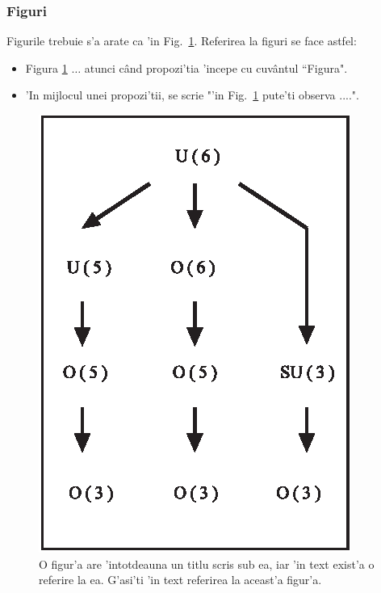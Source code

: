 \subsubsection{Figuri}

Figurile trebuie s'a arate ca 'in Fig.~\ref{fig:figura_exemplu}. Referirea la figuri se face astfel:
\begin{itemize}
\item Figura \ref{fig:figura_exemplu} $\ldots$ atunci c\^and propozi'tia 'incepe cu cuv\^antul
``Figura".
\item 'In mijlocul unei propozi'tii, se scrie "'in Fig.~\ref{fig:figura_exemplu} pute'ti observa ....".
\end{itemize}

\begin{figure}[ht]  %
\centering
\includegraphics{tex_files/figs/authorfig1.eps}
\caption{O figur'a are 'intotdeauna un titlu scris sub ea, iar 'in text exist'a o referire la ea. G'asi'ti 'in text referirea la aceast'a figur'a.}
\label{fig:figura_exemplu}       
\end{figure}

